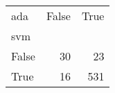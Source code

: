 \begin{tabular}{lrr}
\toprule
ada &  False &  True  \\
svm   &        &        \\
\midrule
False &     30 &     23 \\
True  &     16 &    531 \\
\bottomrule
\end{tabular}
